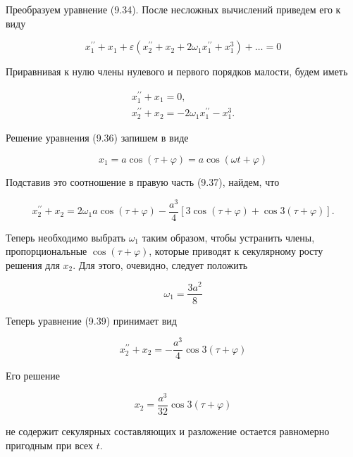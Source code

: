 \documentclass[10pt]{article}
\begin{document}
Преобразуем уравнение (9.34). После несложных вычислений приведем его к виду


\begin{equation*}
x_{1}^{\prime \prime}+x_{1}+\varepsilon\left(x_{2}^{\prime \prime}+x_{2}+2 \omega_{1} x_{1}^{\prime \prime}+x_{1}^{3}\right)+\ldots=0 \tag{9.35}
\end{equation*}


Приравнивая к нулю члены нулевого и первого порядков малости, будем иметь


\begin{gather*}
x_{1}^{\prime \prime}+x_{1}=0,  \tag{9.36}\\
x_{2}^{\prime \prime}+x_{2}=-2 \omega_{1} x_{1}^{\prime \prime}-x_{1}^{3} . \tag{9.37}
\end{gather*}


Решение уравнения (9.36) запишем в виде


\begin{equation*}
x_{1}=a \cos (\tau+\varphi)=a \cos (\omega t+\varphi) \tag{9.38}
\end{equation*}


Подставив это соотношение в правую часть (9.37), найдем, что


\begin{equation*}
x_{2}^{\prime \prime}+x_{2}=2 \omega_{1} a \cos (\tau+\varphi)-\frac{a^{3}}{4}[3 \cos (\tau+\varphi)+\cos 3(\tau+\varphi)] . \tag{9.39}
\end{equation*}


Теперь необходимо выбрать $\omega_{1}$ таким образом, чтобы устранить члены, пропорциональные $\cos (\tau+\varphi)$, которые приводят к секулярному росту решения для $x_{2}$. Для этого, очевидно, следует положить


\begin{equation*}
\omega_{1}=\frac{3 a^{2}}{8} \tag{9.40}
\end{equation*}


Теперь уравнение (9.39) принимает вид


\begin{equation*}
x_{2}^{\prime \prime}+x_{2}=-\frac{a^{3}}{4} \cos 3(\tau+\varphi) \tag{9.41}
\end{equation*}


Его решение


\begin{equation*}
x_{2}=\frac{a^{3}}{32} \cos 3(\tau+\varphi) \tag{9.42}
\end{equation*}


не содержит секулярных составляющих и разложение остается равномерно пригодным при всех $t$.
\end{document}
